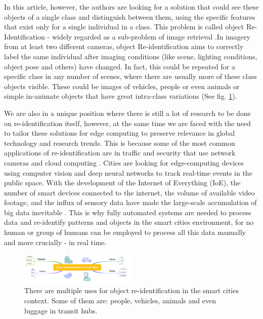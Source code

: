 \documentclass[conference]{IEEEtran} %
\begin{document}
 In this article, however, the authors are looking for a solution that could see these objects of a single class and distinguish between them, using the specific features that exist only for a single individual in a class.
 This problem is called object Re-Identification - widely regarded as a sub-problem of image retrieval \cite{li2019object}.In imagery from at least two different cameras, object Re-identification aims to correctly label the same individual after imaging conditions (like scene, lighting conditions, object pose and others) have changed. In fact, this could be repeated for a specific class in any number of scenes, where there are usually more of these class objects visible. These could be images of vehicles, people or even animals or simple in-animate objects that have great intra-class variations (See fig. \ref{fig:fig1}).
 
 We are also in a unique position where there is still a lot of research to be done on re-identification itself, however, at the same time we are faced with the need to tailor these solutions for edge computing to preserve relevance in global technology and research trends. This is because some of the most common applications of re-identification are in traffic and security that use network cameras and cloud computing \cite{barthelemy2019edge} \cite{wang2024efficient}.
 Cities are looking for edge-computing devices using computer vision and deep neural networks to track real-time events in the public space. With the development of the Internet of Everything (IoE), the number of smart devices connected to the internet, the volume of available video footage, and the influx of sensory data have made the large-scale accumulation of big data inevitable \cite{cao2020overview}. This is why fully automated systems are needed to process data and re-identify patterns and objects in the smart cities environment, for no human or group of humans can be employed to process all this data manually and more crucially - in real time.
 
 \begin{figure}[b]
 	\centering
 	\includegraphics[width=0.5\textwidth]{re_id_diagramma_1.png} %
 	\caption{There are multiple uses for object re-identification in the smart cities context. Some of them are: people, vehicles, animals and even luggage in transit hubs.}
 	\label{fig:fig1} %
 \end{figure}
 
\end{document}

